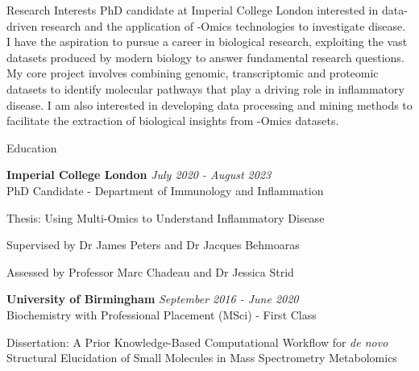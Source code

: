 \documentclass{resume}
\begin{document}
\begin{rSection}{Research Interests}
\vspace{1pt plus 1pt}
PhD candidate at Imperial College London interested in data-driven research and the application of -Omics technologies to investigate disease. I have the aspiration to pursue a career in biological research, exploiting the vast datasets produced by modern biology to answer fundamental research questions. My core project involves combining genomic, transcriptomic and proteomic datasets to identify molecular pathways that play a driving role in inflammatory disease. I am also interested in developing data processing and mining methods to facilitate the extraction of biological insights from -Omics datasets.

\end{rSection}
\begin{rSection}{Education}

\vspace{1pt plus 1pt}
{\bf Imperial College London} \hfill {\em July 2020 - August 2023} 
\\ PhD Candidate - Department of Immunology and Inflammation

\vspace{2pt plus 1pt minus 1pt}
\item Thesis: Using Multi-Omics to Understand Inflammatory Disease
\item Supervised by Dr James Peters and Dr Jacques Behmoaras 
\item Assessed by Professor Marc Chadeau and Dr Jessica Strid

\smallskip

{\bf University of Birmingham} \hfill {\em September 2016 - June 2020} 
\\ Biochemistry with Professional Placement (MSci) - First Class

\vspace{2pt plus 1pt minus 1pt}
\item Dissertation: A Prior Knowledge-Based Computational Workflow for \textit{de novo} Structural Elucidation of Small Molecules in Mass Spectrometry Metabolomics

\end{rSection}

\end{document}
